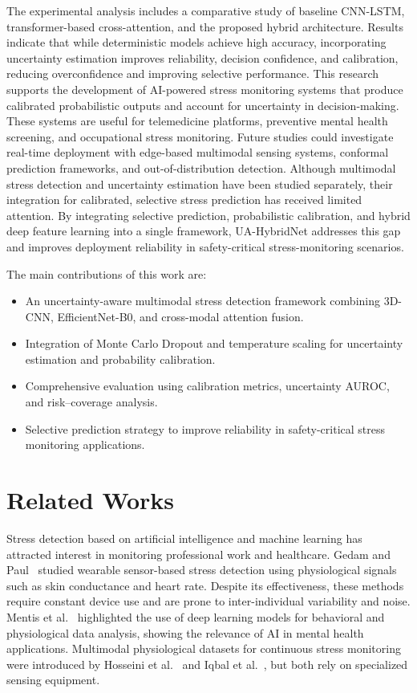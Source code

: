\documentclass[conference]{IEEEtran}
\begin{document}
The experimental analysis includes a comparative study of baseline CNN-LSTM, transformer-based cross-attention, and the proposed hybrid architecture. Results indicate that while deterministic models achieve high accuracy, incorporating uncertainty estimation improves reliability, decision confidence, and calibration, reducing overconfidence and improving selective performance. This research supports the development of AI-powered stress monitoring systems that produce calibrated probabilistic outputs and account for uncertainty in decision-making. These systems are useful for telemedicine platforms, preventive mental health screening, and occupational stress monitoring. Future studies could investigate real-time deployment with edge-based multimodal sensing systems, conformal prediction frameworks, and out-of-distribution detection. Although multimodal stress detection and uncertainty estimation have been studied separately, their integration for calibrated, selective stress prediction has received limited attention. By integrating selective prediction, probabilistic calibration, and hybrid deep feature learning into a single framework, UA-HybridNet addresses this gap and improves deployment reliability in safety-critical stress-monitoring scenarios.

The main contributions of this work are:

\begin{itemize}
\item An uncertainty-aware multimodal stress detection framework combining 3D-CNN, EfficientNet-B0, and cross-modal attention fusion.
\item Integration of Monte Carlo Dropout and temperature scaling for uncertainty estimation and probability calibration.
\item Comprehensive evaluation using calibration metrics, uncertainty AUROC, and risk–coverage analysis.
\item Selective prediction strategy to improve reliability in safety-critical stress monitoring applications.
\end{itemize}

\section{Related Works}

Stress detection based on artificial intelligence and machine learning has attracted interest in monitoring professional work and healthcare. Gedam and Paul~\cite{ref1} studied wearable sensor-based stress detection using physiological signals such as skin conductance and heart rate. Despite its effectiveness, these methods require constant device use and are prone to inter-individual variability and noise. Mentis et al.~\cite{ref2} highlighted the use of deep learning models for behavioral and physiological data analysis, showing the relevance of AI in mental health applications. Multimodal physiological datasets for continuous stress monitoring were introduced by Hosseini et al.~\cite{ref3} and Iqbal et al.~\cite{ref4}, but both rely on specialized sensing equipment. 
\end{document}
